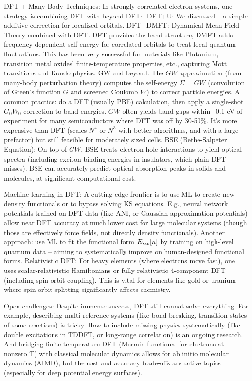 DFT + Many-Body Techniques: In strongly correlated electron systems,
one strategy is combining DFT with beyond-DFT:  DFT+U: We discussed –
a simple additive correction for localized orbitals.  DFT+DMFT:
Dynamical Mean-Field Theory combined with DFT. DFT provides the band
structure, DMFT adds frequency-dependent self-energy for correlated
orbitals to treat local quantum fluctuations. This has been very
successful for materials like Plutonium, transition metal oxides’
finite-temperature properties, etc., capturing Mott transitions and
Kondo physics.  GW and beyond: The $GW$ approximation (from many-body
perturbation theory) computes the self-energy $\Sigma = G W$
(convolution of Green’s function $G$ and screened Coulomb $W$) to
correct particle energies. A common practice: do a DFT (usually PBE)
calculation, then apply a single-shot $G_0W_0$ correction to band
energies. $GW$ often yields band gaps within ~0.1 eV of experiment for
many semiconductors where DFT was off by 30-50$\%$. It’s more
expensive than DFT (scales $N^4$ or $N^3$ with better algorithms, and
with a large prefactor) but still feasible for moderately sized cells.
BSE (Bethe-Salpeter Equation): On top of $GW$, BSE treats
electron-hole interactions to yield optical spectra (including exciton
binding energies in insulators, which plain DFT misses). BSE can
accurately predict optical absorption peaks in solids and molecules,
at significant computational cost.

Machine-learning in DFT: A cutting-edge frontier is to use ML to
create new density functionals or to bypass solving KS
equations. E.g., neural network potentials trained on DFT data (like
ANI, or Gaussian approximation potentials) allow near DFT accuracy at
much lower cost for large molecular systems (though those are
effectively force fields, not directly density functionals). Another
approach: use ML to fit the functional form $E_{\xc}[n]$ by training
on high-level quantum data – aiming to systematically improve on
human-designed functional forms.  Relativistic DFT: For heavy elements
(where electrons move fast), one uses scalar-relativistic Hamiltonians
or fully relativistic 4-component DFT (including spin-orbit
coupling). This is vital for elements like gold or uranium where
spin-orbit splitting significantly affects chemistry.

Open challenges: Despite immense success, DFT still cannot solve
everything. For example, describing multi-reference systems (like bond
breaking, transition states of some reactions) is tricky. How to
include missing physics systematically (like double excitations in
TDDFT, or long-range correlation) is an ongoing research. And bridging
finite-temperature DFT (Mermin functional for electrons at nonzero T)
with classical molecular dynamics allows for ab initio molecular
dynamics (AIMD), but the cost and accuracy trade-offs are active
topics (especially for deep potential energy surfaces). 

